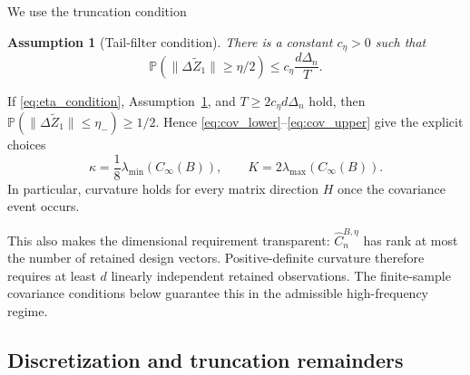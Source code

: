 \documentclass[12pt]{article}
\newtheorem{assumption}{Assumption}
\theoremstyle{definition}
\begin{document}
	We use the truncation condition
	\begin{assumption}[Tail-filter condition]\label{ass:N}
		There is a constant $c_\eta>0$ such that
		\begin{equation}
			\mathbb P\left(\|\Delta\widetilde Z_1\|\ge\eta/2\right)
			\le c_\eta\frac{d\Delta_n}{T}.
			\label{eq:N}
		\end{equation}
	\end{assumption}
	If \eqref{eq:eta_condition}, Assumption~\ref{ass:N}, and $T\ge2c_\eta d\Delta_n$ hold, then
	$\mathbb P(\|\Delta\widetilde Z_1\|\le\eta_-)\ge1/2$. Hence \eqref{eq:cov_lower}--\eqref{eq:cov_upper} give the explicit choices
	\begin{equation}
		\kappa=\frac18\lambda_{\min}(C_\infty(B)),
		\qquad
		K=2\lambda_{\max}(C_\infty(B)).
		\label{eq:kappaK}
	\end{equation}
	In particular, curvature holds for every matrix direction $H$ once the covariance event occurs.
	
	This also makes the dimensional requirement transparent: $\widehat C_n^{B,\eta}$ has rank at most the number of retained design vectors. Positive-definite curvature therefore requires at least $d$ linearly independent retained observations. The finite-sample covariance conditions below guarantee this in the admissible high-frequency regime.
	
	\subsection{Discretization and truncation remainders}
	
\end{document}
